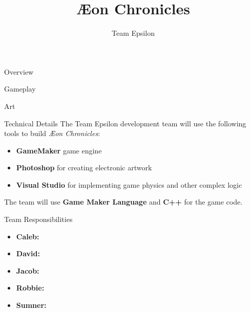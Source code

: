 \documentclass{teamepsilon}
\title{{\AE}on Chronicles}
\author{Team Epsilon}
\institute{Colorado School of Mines}
\begin{document}
\begin{frame}{Overview}

\end{frame}

\begin{frame}{Gameplay}

\end{frame}

\begin{frame}{Art}

\end{frame}

\begin{frame}{Technical Details}
    The Team Epsilon development team will use the following tools to build
    \textit{{\AE}on Chronicles}:

    \begin{itemize}
        \item \textbf{GameMaker} game engine
        \item \textbf{Photoshop} for creating electronic artwork
        \item \textbf{Visual Studio} for implementing game physics and other
            complex logic
    \end{itemize}

    The team will use \textbf{Game Maker Language} and \textbf{C++} for the game
    code.
\end{frame}

\begin{frame}{Team Responsibilities}
    \begin{itemize}
        \item \textbf{Caleb:}
        \item \textbf{David:}
        \item \textbf{Jacob:}
        \item \textbf{Robbie:}
        \item \textbf{Sumner:}
    \end{itemize}
\end{frame}
\end{document}
